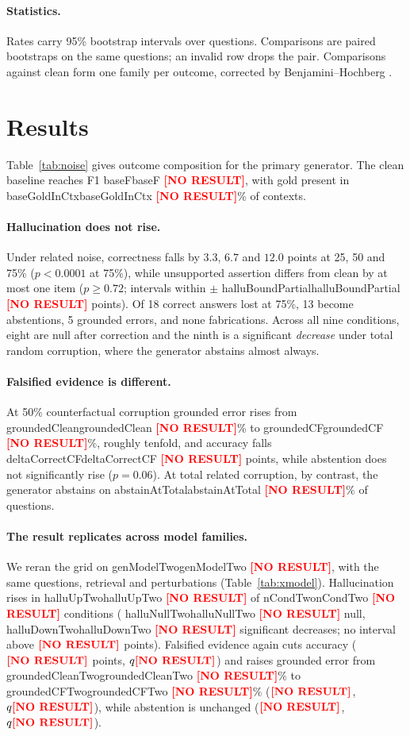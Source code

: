 \documentclass[11pt]{article}
\newcommand{\NUM}[1]{%
  \ifcsname #1\endcsname\csname #1\endcsname\else
  \textcolor{red}{\textbf{[NO RESULT]}}\fi}
\begin{document}
\paragraph{Statistics.}
Rates carry 95\% bootstrap intervals over questions. Comparisons are paired bootstraps
on the same questions; an invalid row drops the pair. Comparisons against clean form
one family per outcome, corrected by Benjamini--Hochberg \citep{benjamini1995fdr}.

\section{Results}
\label{sec:results}


Table~\ref{tab:noise} gives outcome composition for the primary generator. The clean
baseline reaches F1 \NUM{baseF}, with gold present in \NUM{baseGoldInCtx}\% of contexts.

\paragraph{Hallucination does not rise.}
Under related noise, correctness falls by $3.3$, $6.7$ and $12.0$ points at 25, 50 and
75\% ($p<0.0001$ at 75\%), while unsupported assertion differs from clean by at most
one item ($p \geq 0.72$; intervals within $\pm$\NUM{halluBoundPartial} points). Of 18
correct answers lost at 75\%, 13 become abstentions, 5 grounded errors, and none
fabrications. Across all nine conditions, eight are null after correction and the
ninth is a significant \emph{decrease} under total random corruption, where the
generator abstains almost always.

\paragraph{Falsified evidence is different.}
At 50\% counterfactual corruption grounded error rises from \NUM{groundedClean}\% to
\NUM{groundedCF}\%, roughly tenfold, and accuracy falls \NUM{deltaCorrectCF} points,
while abstention does not significantly rise ($p = 0.06$). At total related corruption,
by contrast, the generator abstains on \NUM{abstainAtTotal}\% of questions.

\paragraph{The result replicates across model families.}

We reran the grid on \NUM{genModelTwo}, with the same questions, retrieval and
perturbations (Table~\ref{tab:xmodel}). Hallucination rises in \NUM{halluUpTwo} of
\NUM{nCondTwo} conditions (\NUM{halluNullTwo} null, \NUM{halluDownTwo} significant
decreases; no interval above \(\NUM{halluMaxUpperTwo}\) points). Falsified evidence
again cuts accuracy (\(\NUM{cfDeltaCorrectTwo}\) points, \(q \NUM{cfQCorrectTwo}\)) and
raises grounded error from \NUM{groundedCleanTwo}\% to \NUM{groundedCFTwo}\%
(\(\NUM{cfDeltaGroundedTwo}\), \(q \NUM{cfQGroundedTwo}\)), while abstention
is unchanged (\(\NUM{cfDeltaAbstainTwo}\), \(q \NUM{cfQAbstainTwo}\)).
\end{document}
